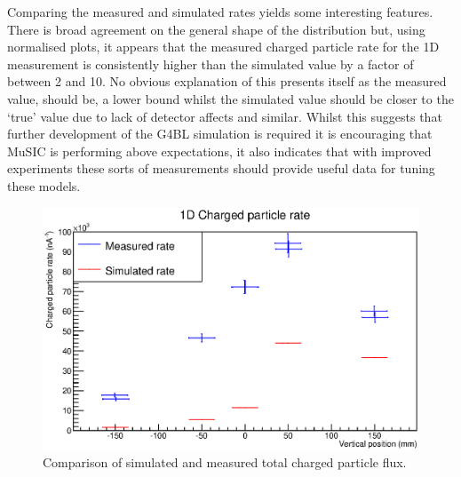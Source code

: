 Comparing the measured and simulated rates yields some interesting features. There is broad agreement on the general shape of the distribution but, using normalised plots, it appears that the measured charged particle rate for the 1D measurement is consistently higher than the simulated value by a factor of between 2 and 10. No obvious explanation of this presents itself as the measured value, should be, a lower bound whilst the simulated value should be closer to the `true' value due to lack of detector affects and similar. Whilst this suggests that further development of the G4BL simulation is required it is encouraging that MuSIC is performing above expectations, it also indicates that with improved experiments these sorts of measurements should provide useful data for tuning these models.

\begin{figure}[hptb]
  \centering
    \includegraphics[width=.9\textwidth]{images/plot_generating_scripts/1D_charged_particle_flux.eps}
  \caption{Comparison of simulated and measured total charged particle flux.}
  \label{fig:images_plot_generating_scripts_1D_charged_particle_flux}
\end{figure}
  
